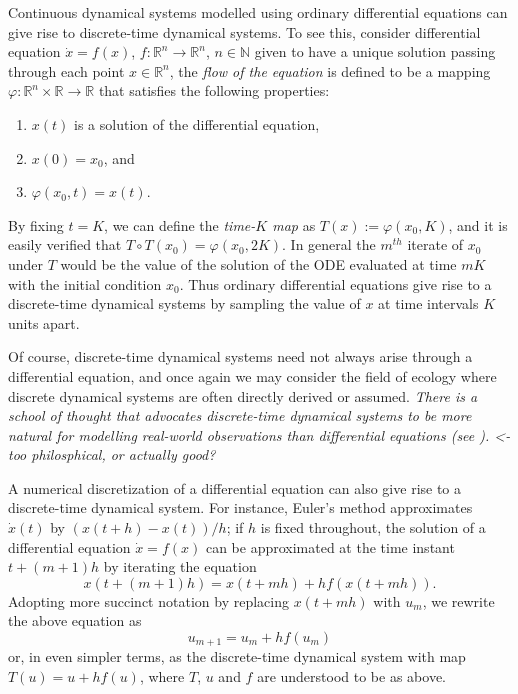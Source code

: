 \documentclass[12 pt]{article}
\begin{document}
Continuous dynamical systems modelled using ordinary differential equations can give rise to discrete-time dynamical systems. To see this, consider differential equation $\dot{x} = f(x)$, $f: \mathbb{R}^n \to \mathbb{R}^n$, $n\in\mathbb{N}$ given to have a unique solution passing through 
each point $x\in\mathbb{R}^{n}$, the \emph{flow of the equation} is defined to be a mapping $\varphi: \mathbb{R}^n \times \mathbb{R} \to \mathbb{R}$ that satisfies the following properties:
\vspace{-8mm}
\begin{enumerate}[noitemsep, label=\roman*.]
  \item $x(t)$ is a solution of the differential equation,
  \item $x(0)=x_0$, and
  \item $\varphi(x_0,t) = x(t)$.
\end{enumerate}
By fixing $t=K$, we can define the \emph{time-$K$ map} as  $T(x):= \varphi(x_0,K)$, and it is easily verified that $T\circ T(x_0) = \varphi(x_0,2K)$. In general the $m^{th}$ iterate of $x_0$ under $T$ would be the value of the solution of the ODE evaluated at time $mK$ with the initial condition $x_0$. 
Thus ordinary differential equations give rise to a discrete-time dynamical systems by sampling the value of $x$ at time intervals $K$ units apart. 

Of course, discrete-time dynamical systems need not always arise through a differential equation, and once again we may consider the field of ecology where discrete dynamical systems are often directly derived or assumed. 
\emph{There is a school of thought that advocates discrete-time dynamical systems to be more natural for modelling real-world observations than differential equations (see \cite{saber2010introduction}).  <- too philosphical, or actually good?}

A numerical discretization of a differential equation can also give rise to a discrete-time dynamical system. For instance, Euler's method approximates $\dot{x}(t)$ by $(x(t+h)-x(t))/h$; if $h$ is fixed throughout, the solution of a differential equation $\dot{x}=f(x)$ 
can be approximated at the time instant $t+(m+1)h$ by iterating the equation 
$$x(t+(m+1)h) = x(t+mh) + h f(x(t+mh)).$$ 
Adopting more succinct notation by replacing $x(t+mh)$ with $u_m$, we rewrite the above equation as
$$u_{m+1} = u_m + hf(u_m)$$
or, in even simpler terms, as the discrete-time dynamical system with map $T(u) = u + hf(u)$, where $T$, $u$ and $f$ are understood to be as above.
\end{document}
